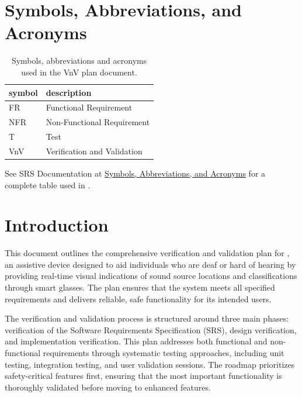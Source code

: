 \documentclass[12pt, titlepage]{article}
\begin{document}
\newpage

\tableofcontents

\listoftables

\newpage

\section{Symbols, Abbreviations, and Acronyms}

\renewcommand{\arraystretch}{1.2}
\begin{table}[H]
  \centering
  \begin{tabular}{|l|l|} 
    \hline	
    \textbf{symbol} & \textbf{description}\\
    \hline
    FR & Functional Requirement\\
    NFR & Non-Functional Requirement\\
    T & Test\\
    VnV & Verification and Validation \\
    \hline
  \end{tabular}
  \caption{Symbols, abbreviations and acronyms used in the VnV plan document.}
\end{table}

See SRS Documentation at
\hyperref[SRS-sec:symbols]{Symbols, Abbreviations, and Acronyms}
for a complete table used in \progname.

\newpage


\section{Introduction}

This document outlines the comprehensive verification and validation plan for
\progname{}, an assistive device designed to aid individuals who are deaf or
hard of hearing by providing real-time visual indications of sound source
locations and classifications through smart glasses. The plan ensures that the
system meets all specified requirements and delivers reliable, safe
functionality for its intended users.

The verification and validation process is structured around three main phases:
verification of the Software Requirements Specification (SRS), design
verification, and implementation verification. This plan addresses both
functional and non-functional requirements through systematic testing
approaches, including unit testing, integration testing, and user validation
sessions. The roadmap prioritizes safety-critical features first, ensuring that
the most important functionality is thoroughly validated before moving to
enhanced features.
\end{document}

